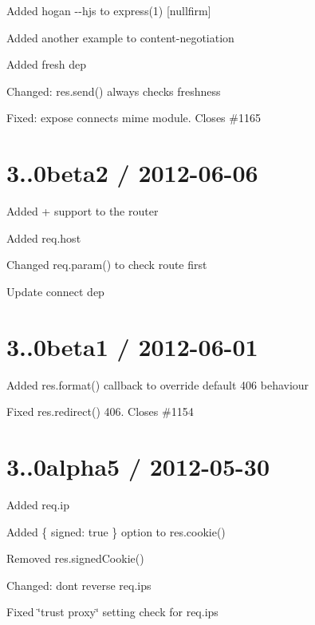 {\ttfamily }

{\ttfamily 
\begin{DoxyItemize}
\item Added hogan {\ttfamily -\/-\/hjs} to express(1) \mbox{[}nullfirm\mbox{]}
\item Added another example to content-\/negotiation
\item Added {\ttfamily fresh} dep
\item Changed\+: {\ttfamily res.\+send()} always checks freshness
\item Fixed\+: expose connects mime module. Closes \#1165
\end{DoxyItemize}}

{\ttfamily \section*{3..\+0beta2 / 2012-\/06-\/06 }}

{\ttfamily }

{\ttfamily 
\begin{DoxyItemize}
\item Added {\ttfamily +} support to the router
\item Added {\ttfamily req.\+host}
\item Changed {\ttfamily req.\+param()} to check route first
\item Update connect dep
\end{DoxyItemize}}

{\ttfamily \section*{3..\+0beta1 / 2012-\/06-\/01 }}

{\ttfamily }

{\ttfamily 
\begin{DoxyItemize}
\item Added {\ttfamily res.\+format()} callback to override default 406 behaviour
\item Fixed {\ttfamily res.\+redirect()} 406. Closes \#1154
\end{DoxyItemize}}

{\ttfamily \section*{3..\+0alpha5 / 2012-\/05-\/30 }}

{\ttfamily }

{\ttfamily 
\begin{DoxyItemize}
\item Added {\ttfamily req.\+ip}
\item Added {\ttfamily \{ signed\+: true \}} option to {\ttfamily res.\+cookie()}
\item Removed {\ttfamily res.\+signed\+Cookie()}
\item Changed\+: dont reverse {\ttfamily req.\+ips}
\item Fixed \char`\"{}trust proxy\char`\"{} setting check for {\ttfamily req.\+ips}
\end{DoxyItemize}}

